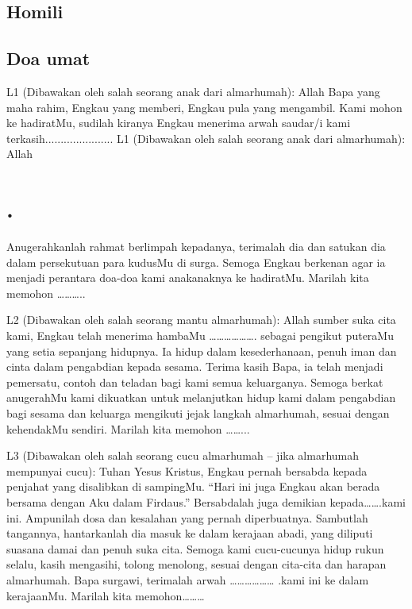 
\subsection*{Homili}
\subsection*{Doa umat}

L1 (Dibawakan oleh salah seorang anak dari almarhumah): Allah
Bapa yang maha rahim, Engkau yang memberi, Engkau pula yang
mengambil. Kami mohon ke hadiratMu, sudilah kiranya Engkau
menerima arwah saudar/i kami terkasih......................
L1 (Dibawakan oleh salah seorang anak dari almarhumah): Allah
\section*{.}

Anugerahkanlah rahmat berlimpah kepadanya, terimalah dia dan
satukan dia dalam persekutuan para kudusMu di surga. Semoga
Engkau berkenan agar ia menjadi perantara doa-doa kami anakanaknya
ke hadiratMu. Marilah kita memohon ………..

L2 (Dibawakan oleh salah seorang mantu almarhumah): Allah
sumber suka cita kami, Engkau telah menerima hambaMu
………………. sebagai pengikut puteraMu yang setia sepanjang
hidupnya. Ia hidup dalam kesederhanaan, penuh iman dan cinta
dalam pengabdian kepada sesama. Terima kasih Bapa, ia telah
menjadi pemersatu, contoh dan teladan bagi kami semua
keluarganya. Semoga berkat anugerahMu kami dikuatkan untuk
melanjutkan hidup kami dalam pengabdian bagi sesama dan keluarga
mengikuti jejak langkah almarhumah, sesuai dengan kehendakMu
sendiri. Marilah kita memohon ……...

L3 (Dibawakan oleh salah seorang cucu almarhumah – jika
almarhumah mempunyai cucu): Tuhan Yesus Kristus, Engkau pernah
bersabda kepada penjahat yang disalibkan di sampingMu. “Hari ini
juga Engkau akan berada bersama dengan Aku dalam Firdaus.”
Bersabdalah juga demikian kepada…….kami ini. Ampunilah dosa
dan kesalahan yang pernah diperbuatnya. Sambutlah tangannya,
hantarkanlah dia masuk ke dalam kerajaan abadi, yang diliputi
suasana damai dan penuh suka cita. Semoga kami cucu-cucunya
hidup rukun selalu, kasih mengasihi, tolong menolong, sesuai dengan
cita-cita dan harapan almarhumah. Bapa surgawi, terimalah arwah
……………… .kami ini ke dalam kerajaanMu. Marilah kita
memohon………

